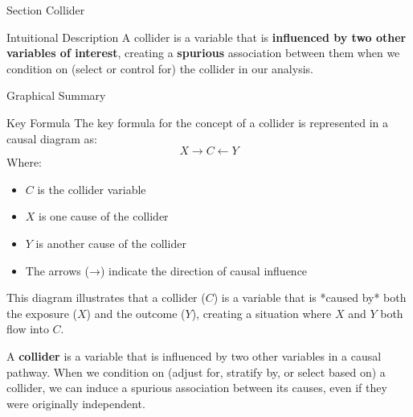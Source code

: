 
\begin{frame}{Section}
\centering
\Huge{Collider}
\end{frame}


\begin{frame}{Intuitional Description}
A collider is a variable that is \textbf{influenced by two other variables of interest}, creating a \textbf{spurious} association between them when we condition on (select or control for) the collider in our analysis.
\end{frame}

\begin{frame}{Graphical Summary}

\end{frame}


\begin{frame}{Key Formula}
The key formula for the concept of a collider is represented in a causal diagram as:
$$
X \rightarrow C \leftarrow Y
$$
Where:
\begin{itemize}
\item $C$ is the collider variable
\item $X$ is one cause of the collider
\item $Y$ is another cause of the collider
\item The arrows (→) indicate the direction of causal influence
\end{itemize}

This diagram illustrates that a collider ($C$) is a variable that is *caused by* both the exposure ($X$) and the outcome ($Y$), creating a situation where $X$ and $Y$ both flow into $C$.

A \textbf{collider} is a variable that is influenced by two other variables in a causal pathway. When we condition on (adjust for, stratify by, or select based on) a collider, we can induce a spurious association between its causes, even if they were originally independent.

\end{frame}


